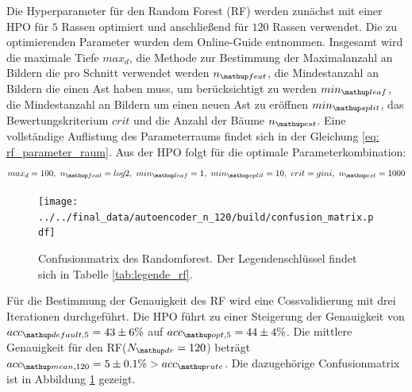 Die Hyperparameter für den Random Forest (RF) werden zunächst mit
einer HPO für $5$ Rassen optimiert und anschließend für $120$ Rassen verwendet.
Die zu optimierenden Parameter
wurden dem Online-Guide \cite{RF_parameterraum} entnommen. Insgesamt
wird die maximale Tiefe $max_d$, die Methode zur Bestimmung der Maximalanzahl
an Bildern die pro Schnitt verwendet werden
$n\ua{feat}$, die Mindestanzahl an Bildern die einen Ast haben muss,
um berücksichtigt zu werden $min\ua{leaf}$, die Mindestanzahl an Bildern um
einen neuen Ast zu eröffnen $min\ua{split}$, das Bewertungskriterium $crit$ und
die Anzahl der Bäume $n\ua{est}$.
Eine vollständige Auflistung des Parameterraums findet sich in der
Gleichung \eqref{eq: rf_parameter_raum}.
Aus der HPO folgt für die optimale Parameterkombination:
\begin{equation*}
  max_d = 100,\,\, n\ua{feat}= log2, \,\, min\ua{leaf}= 1,\,\, min\ua{split}=10, \,\,   crit= gini, \,\, n\ua{est}=1000
\end{equation*}
\begin{figure}
  \vspace{-25pt}
\begin{center}
\texttt{[image: ../../final\_data/autoencoder\_n\_120/build/confusion\_matrix.pdf]}
\end{center}
\vspace{-20pt}
\caption{Confusionmatrix des Randomforest. Der Legendenschlüssel findet sich in
Tabelle \ref{tab:legende_rf}.}
\label{fig:Confusionmatrix_rf}
\vspace{-100pt}
\end{figure}
Für die Bestimmung der Genauigkeit des RF wird eine Cossvalidierung mit
drei Iterationen durchgeführt. Die HPO führt zu einer Steigerung der Genauigkeit von  $acc\ua{default, 5}=43\pm6\%$ auf $acc\ua{opt, 5}=44\pm4\%$.
Die mittlere Genauigkeit für den RF($N\ua{dr}=120$) beträgt $acc\ua{mean,120}=5\pm0.1\% > acc\ua{rate}$. Die dazugehörige Confusionmatrix ist in Abbildung \ref{fig:Confusionmatrix_rf} gezeigt.

